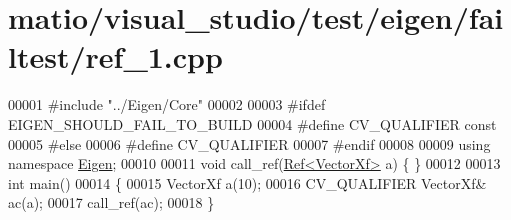 \hypertarget{matio_2visual__studio_2test_2eigen_2failtest_2ref__1_8cpp_source}{}\section{matio/visual\+\_\+studio/test/eigen/failtest/ref\+\_\+1.cpp}
\label{matio_2visual__studio_2test_2eigen_2failtest_2ref__1_8cpp_source}

\begin{DoxyCode}
00001 \textcolor{preprocessor}{#include "../Eigen/Core"}
00002 
00003 \textcolor{preprocessor}{#ifdef EIGEN\_SHOULD\_FAIL\_TO\_BUILD}
00004 \textcolor{preprocessor}{#define CV\_QUALIFIER const}
00005 \textcolor{preprocessor}{#else}
00006 \textcolor{preprocessor}{#define CV\_QUALIFIER}
00007 \textcolor{preprocessor}{#endif}
00008 
00009 \textcolor{keyword}{using namespace }\hyperlink{namespace_eigen}{Eigen};
00010 
00011 \textcolor{keywordtype}{void} call\_ref(\hyperlink{group___core___module_class_eigen_1_1_ref}{Ref<VectorXf>} a) \{ \}
00012 
00013 \textcolor{keywordtype}{int} main()
00014 \{
00015   VectorXf a(10);
00016   CV\_QUALIFIER VectorXf& ac(a);
00017   call\_ref(ac);
00018 \}
\end{DoxyCode}
